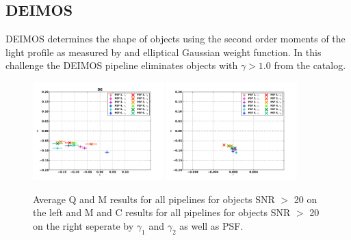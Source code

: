 \newpage 
\subsection{DEIMOS}
DEIMOS determines the shape of objects using the second
order moments of the light profile as measured by and elliptical
Gaussian weight function. In this challenge the DEIMOS pipeline eliminates objects with $ \gamma > 1.0 $
from the catalog. \\
 
\begin{figure}
\centering
\includegraphics[width=0.45\textwidth]{fig/QMC_main_DE_f.pdf} 
\includegraphics[width=0.45\textwidth]{fig/MC_main_DE_f.pdf} 
\caption{Average Q and M results for all pipelines for objects 
SNR $>$ 20 on the left and M and C results for all pipelines for objects 
SNR $>$ 20 on the right seperate by $\gamma_{1} $ and $\gamma_{2} $ as
well as PSF.}
\label{fig:DEIMOS_qmc}
\end{figure}

